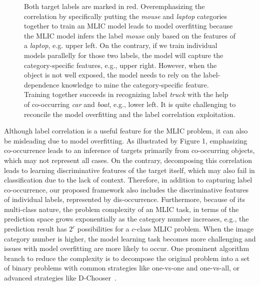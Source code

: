 \documentclass{article}
\begin{document}
\begin{figure}[t]
{    Both target labels are marked in red.
    Overemphasizing the correlation by specifically putting the \emph{mouse} and \emph{laptop} categories together to train an MLIC model leads to model overfitting because the MLIC model infers the label \emph{mouse} only based on the features of a \emph{laptop}, e.g. upper left.
    On the contrary, if we train individual models parallelly for those two labels, the model will capture the category-specific features, e.g., upper right.
    However, when the object is not well exposed, the model needs to rely on the label-dependence knowledge to mine the category-specific feature.
    Training together succeeds in recognizing label \emph{truck} with the help of co-occurring \emph{car} and \emph{boat}, e.g., lower left.
    It is quite challenging to reconcile the model overfitting and the label correlation exploitation.
    }
    \label{fig1}
    \vspace{-0.5cm}
\end{figure}

Although label correlation is a useful feature for the MLIC problem, it can also be misleading due to model overfitting.
As illustrated by Figure 1, emphasizing co-occurrence leads to an inference of targets primarily from co-occurring objects, which may not represent all cases.
On the contrary, decomposing this correlation leads to learning discriminative features of the target itself, which may also fail in classification due to the lack of context.
Therefore, in addition to capturing label co-occurrence, our proposed framework also includes the discriminative features of individual labels, represented by dis-occurrence.
Furthermore, because of its multi-class nature, the problem complexity of an MLIC task, in terms of the prediction space grows exponentially as the category number increases, e.g., the prediction result has $2^c$ possibilities for a $c$-class MLIC problem.
When the image category number is higher, the model learning task becomes more challenging and issues with model overfitting are more likely to occur.
One prominent algorithm branch to reduce the complexity is to decompose the original problem into a set of binary problems with common strategies like one-vs-one and one-vs-all, or advanced strategies like D-Chooser~\cite{chen2021efficient}.
\end{document}
